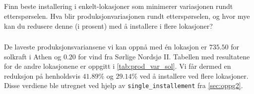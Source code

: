 \documentclass{article}
\begin{document}
\subsection{}
Finn beste installering i enkelt-lokasjoner som minimerer variasjonen rundt etterspørselen.
Hva blir produksjonvariasjonen rundt etterspørselen, og hvor mye kan du redusere denne (i prosent) med å installere i flere lokasjoner?

\subsubsection{}
De laveste produksjonsvariansene vi kan oppnå med én lokasjon er $735.50$ for solkraft i Athen og $0.20$ for vind fra Sørlige Nordsjø II.
Tabellen med resultatene for de andre lokasjonene er oppgitt i \autoref{tab:prod_var_sol}.
Vi får dermed en reduksjon på henholdsvis $41.89\%$ og $29.14\%$ ved å installere ved flere lokasjoner.
Disse verdiene ble utregnet ved hjelp av \verb|single_installement| fra \autoref{sec:oppg2}.

\begin{table}[h]
\centering
{}
\quad
{}
\caption{Produksjonsvarians og nødvendigkapasitet ved enkelt-lokasjoner per teknologi.}
\label{tab:prod_var_sol}
\end{table}
\end{document}
